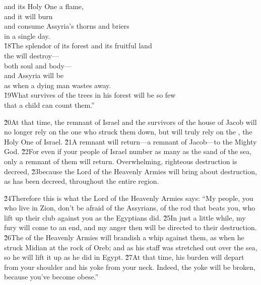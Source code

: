 \begin{poetry}
\poemll    and its Holy One a flame, \\
\poeml and it will burn \\
\poemll    and consume Assyria's thorns and briers \\
\poemlll       in a single day. \\
\poeml \v{18}The splendor of its forest and its fruitful land \\
\poemll    the  will destroy--- \\
\poemlll       both soul and body--- \\
\poeml and Assyria will be \\
\poemll    as when a dying man wastes away. \\
\poeml \v{19}What survives of the trees in his forest will be so few \\
\poemll    that a child can count them.''
\end{poetry}

\v{20}At that time, the remnant of Israel and the survivors of the house of Jacob will no longer rely on the one who struck them down, but will truly rely on the , the Holy One of Israel. \v{21}A remnant will return---a remnant of Jacob---to the Mighty God. \v{22}For even if your people of Israel number as many as the sand of the sea, only a remnant of them will return. Overwhelming, righteous destruction is decreed, \v{23}because the Lord  of the Heavenly Armies will bring about destruction, as has been decreed, throughout the entire region.

\v{24}Therefore this is what the Lord  of the Heavenly Armies says: ``My people, you who live in Zion, don't be afraid of the Assyrians, of the rod that beats you, who lift up their club against you as the Egyptians did. \v{25}In just a little while, my fury will come to an end, and my anger then will be directed to their destruction. \v{26}The  of the Heavenly Armies will brandish a whip against them, as when he struck Midian at the rock of Oreb; and as his staff was stretched out over the sea, so he will lift it up as he did in Egypt. \v{27}At that time, his burden will depart from your shoulder and his yoke from your neck. Indeed, the yoke will be broken, because you've become obese.''

